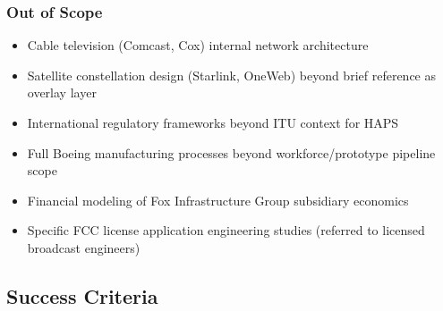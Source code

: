 \documentclass[11pt,letterpaper]{article}
\begin{document}
\subsubsection{Out of Scope}
\begin{itemize}
  \item Cable television (Comcast, Cox) internal network architecture
  \item Satellite constellation design (Starlink, OneWeb) beyond brief reference as overlay layer
  \item International regulatory frameworks beyond ITU context for HAPS
  \item Full Boeing manufacturing processes beyond workforce/prototype pipeline scope
  \item Financial modeling of Fox Infrastructure Group subsidiary economics
  \item Specific FCC license application engineering studies (referred to licensed broadcast engineers)
\end{itemize}

\subsection{Success Criteria}
\end{document}
